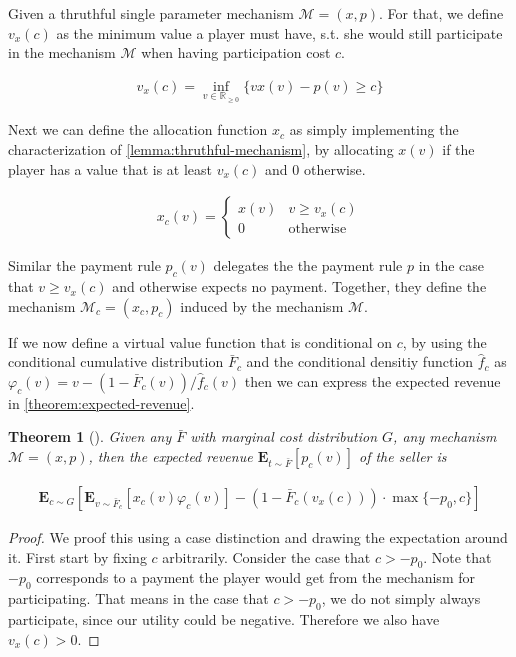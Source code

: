 \documentclass[11pt,a4paper]{article}
\newtheorem{theorem}{Theorem}
\newcommand{\RR}{\ensuremath{\mathbb{R}}}
\newcommand{\1}[1]{\mbox{\rm\bf 1}_{#1}}
\begin{document}
\begin{section}{}
 Given a thruthful single parameter mechanism $\mathcal{M}=(x,p)$.
 For that, we define $v_x(c)$ as the minimum value a player must have, s.t. she would still participate in the mechanism $\mathcal{M}$ when having participation cost $c$.

 \begin{align*}
     v_x(c) = \inf_{v \in \RR_{\geq 0}} \{vx(v) - p(v) \geq c\}
 \end{align*}

 Next we can define the allocation function $x_c$ as simply implementing the characterization of \autoref{lemma:thruthful-mechanism},
 by allocating $x(v)$ if the player has a value that is at least $v_x(c)$ and $0$ otherwise.

 \begin{align*}
     x_c(v) = \begin{cases}
                  x(v) & v \geq v_x(c)    \\
                  0    & \text{otherwise}
              \end{cases}
 \end{align*}

 Similar the payment rule $p_c(v)$ delegates the the payment rule $p$ in the case that $v \geq v_x(c)$ and otherwise expects no payment.
 Together, they define the mechanism $\mathcal{M}_c = (x_c, p_c)$ induced by the mechanism $\mathcal{M}$.

 If we now define a virtual value function that is conditional on $c$, by using the conditional cumulative distribution $\bar{F}_c$ and the conditional densitiy function $\hat{f}_c$ as
 $\varphi_c(v) = v - (1- \bar{F}_c(v)) / \hat{f}_c(v)$ then we can express the expected revenue in \autoref{theorem:expected-revenue}.

 \begin{theorem}[\cite{primary}]
     \label{theorem:expected-revenue}
     Given any $\bar{F}$ with marginal cost distribution $G$, any mechanism $\mathcal{M}=(x,p)$, then the expected revenue $\mathbf{E}_{t \sim \bar{F}}\left[p_c(v)\right]$ of the seller is

     \begin{align*}
         \mathbf{E}_{c \sim G}\left[\mathbf{E}_{v\sim\bar{F}_c}\left[x_c(v)\varphi_c(v)\right] - (1-\bar{F}_c(v_x(c))) \cdot \max\{-p_0,c\}\right]
     \end{align*}
 \end{theorem}

 \begin{proof}
     We proof this using a case distinction and drawing the expectation around it.
     First start by fixing $c$ arbitrarily.
     Consider the case that $c > -p_0$. Note that $-p_0$ corresponds to a payment the player would get from the mechanism for participating.
     That means in the case that $c > -p_0$, we do not simply always participate, since our utility could be negative. Therefore we also have $v_x(c) > 0$.


\end{proof}
\end{section}
\end{document}
